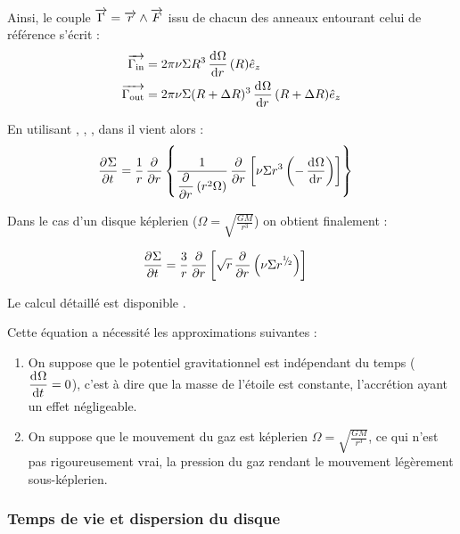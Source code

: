 \bigskip

Ainsi, le couple ${\overrightarrow{\Gamma}}={\overrightarrow{r}}\wedge{\overrightarrow{F}}$ issu de chacun des anneaux entourant celui de référence s'écrit :
\begin{subequations}
\begin{align}
{\overrightarrow{\Gamma_\text{in}}} &= 2\pi\nu \Sigma R^3 \mathinner{ \dfrac{\operatorname{d \!}{^{}}\Omega}{\operatorname{d \!}{{r}^{}}} }(R) \hat{e}_z\label{eq:G_in}\\
{\overrightarrow{\Gamma_\text{out}}} &= 2\pi\nu \Sigma (R+\Delta R)^3 \mathinner{ \dfrac{\operatorname{d \!}{^{}}\Omega}{\operatorname{d \!}{{r}^{}}} }(R+\Delta R) \hat{e}_z\label{eq:G_out}
\end{align}\label{eq:J_torques}
\end{subequations}

\bigskip

En utilisant , , , dans  il vient alors :
\begin{align}
\mathinner{ \dfrac{\partial{^{}}\Sigma}{\partial{{t}^{}}} } &= \frac{1}{r}\mathinner{ \dfrac{\partial{^{}}}{\partial{{r}^{}}} }\left\{\frac{1}{\mathinner{ \dfrac{\partial{^{}}}{\partial{{r}^{}}} }\left(r^2\Omega\right)} \mathinner{ \dfrac{\partial{^{}}}{\partial{{r}^{}}} }\left[\nu \Sigma r^3 \left(-\mathinner{ \dfrac{\operatorname{d \!}{^{}}\Omega}{\operatorname{d \!}{{r}^{}}} }\right)\right]\right\}
\end{align}

Dans le cas d'un disque képlerien ($\Omega = \sqrt{\frac{GM}{r^3}}$) on obtient finalement :
\begin{important}
\begin{align}
\mathinner{ \dfrac{\partial{^{}}\Sigma}{\partial{{t}^{}}} } &=\frac{3}{r}\mathinner{ \dfrac{\partial{^{}}}{\partial{{r}^{}}} }\left[\sqrt{r} \mathinner{ \dfrac{\partial{^{}}}{\partial{{r}^{}}} }\left(\nu \Sigma r^{{}^{1\!\!}/ _{\!2}}\right)\right]
\end{align}
\end{important}

Le calcul détaillé est disponible .

Cette équation a nécessité les approximations suivantes : 
\begin{enumerate}
\item On suppose que le potentiel gravitationnel est indépendant du temps ($\mathinner{ \dfrac{\operatorname{d \!}{^{}}\Omega}{\operatorname{d \!}{{t}^{}}} }=0$), c'est à dire que la masse de l'étoile est constante, l'accrétion ayant un effet négligeable.
\item On suppose que le mouvement du gaz est képlerien $\Omega=\sqrt{\frac{GM}{r^3}}$, ce qui n'est pas rigoureusement vrai, la pression du gaz rendant le mouvement légèrement sous-képlerien.
\end{enumerate}

\subsubsection{Temps de vie et dispersion du disque}\label{sec:dispersion}

